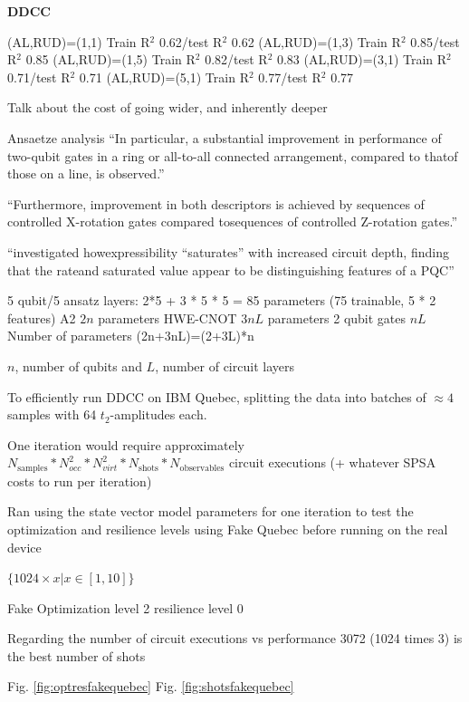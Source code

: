 \documentclass[journal=jacsat,manuscript=article]{achemso}
\begin{document}
\textbf{DDCC}

(AL,RUD)=(1,1) Train R$^{2}$ 0.62/test R$^{2}$ 0.62
(AL,RUD)=(1,3) Train R$^{2}$ 0.85/test R$^{2}$ 0.85
(AL,RUD)=(1,5) Train R$^{2}$ 0.82/test R$^{2}$ 0.83
(AL,RUD)=(3,1) Train R$^{2}$ 0.71/test R$^{2}$ 0.71
(AL,RUD)=(5,1) Train R$^{2}$ 0.77/test R$^{2}$ 0.77

Talk about the cost of going wider, and inherently deeper








Ansaetze analysis \cite{sim_expressibility_2019}
``In particular, a substantial improvement in performance of two-qubit gates in a ring or all-to-all connected arrangement, compared to thatof those on a line, is observed.''

``Furthermore, improvement in both descriptors is achieved by sequences of controlled X-rotation gates compared tosequences of controlled Z-rotation gates.''

``investigated howexpressibility “saturates” with increased circuit depth, finding that the rateand saturated value appear to be distinguishing features of a PQC''



5 qubit/5 ansatz layers: 2*5 + 3 * 5 * 5 = 85 parameters (75 trainable, 5 * 2 features)
A2 $2n$ parameters
HWE-CNOT $3nL$ parameters
2 qubit gates $nL$
Number of parameters (2n+3nL)=(2+3L)*n

$n$, number of qubits and $L$, number of circuit layers

To efficiently run DDCC on IBM Quebec, splitting the data into batches of $\approx 4$ samples with 64 $t_{2}$-amplitudes each.

One iteration would require approximately $N_{\text{samples}} * N_{occ}^{2} * N_{virt}^{2} * N_{\text{shots}} * N_{\text{observables}}$ circuit executions (+ whatever SPSA costs to run per iteration)


Ran using the state vector model parameters for one iteration to test the optimization and resilience levels using Fake Quebec before running on the real device

$\{1024 \times x \vert  x \in [1,10]\}$ 

Fake
Optimization level 2 
resilience level 0

Regarding the number of circuit executions vs performance 3072 (1024 times 3) is the best number of shots


Fig. \ref{fig:optresfakequebec}
Fig. \ref{fig:shotsfakequebec}
\end{document}
